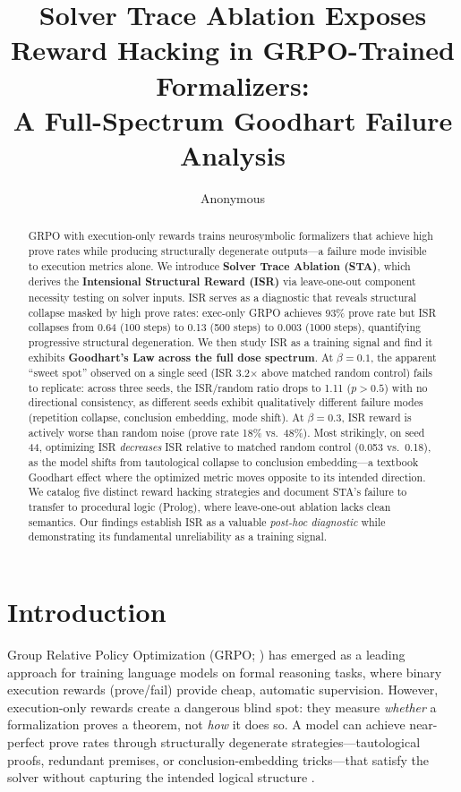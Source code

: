 \documentclass[11pt,a4paper]{article}
\title{Solver Trace Ablation Exposes Reward Hacking in GRPO-Trained Formalizers:\\A Full-Spectrum Goodhart Failure Analysis}
\author{Anonymous}
\date{}
\begin{document}
\maketitle

\begin{abstract}
GRPO with execution-only rewards trains neurosymbolic formalizers that achieve high prove rates while producing structurally degenerate outputs---a failure mode invisible to execution metrics alone.
We introduce \textbf{Solver Trace Ablation (STA)}, which derives the \textbf{Intensional Structural Reward (ISR)} via leave-one-out component necessity testing on solver inputs.
ISR serves as a diagnostic that reveals structural collapse masked by high prove rates: exec-only GRPO achieves 93\% prove rate but ISR collapses from 0.64 (100 steps) to 0.13 (500 steps) to 0.003 (1000 steps), quantifying progressive structural degeneration.
We then study ISR as a training signal and find it exhibits \textbf{Goodhart's Law across the full dose spectrum}.
At $\beta{=}0.1$, the apparent ``sweet spot'' observed on a single seed (ISR 3.2$\times$ above matched random control) fails to replicate: across three seeds, the ISR/random ratio drops to 1.11 ($p > 0.5$) with no directional consistency, as different seeds exhibit qualitatively different failure modes (repetition collapse, conclusion embedding, mode shift).
At $\beta{=}0.3$, ISR reward is actively worse than random noise (prove rate 18\% vs.\ 48\%).
Most strikingly, on seed 44, optimizing ISR \emph{decreases} ISR relative to matched random control (0.053 vs.\ 0.18), as the model shifts from tautological collapse to conclusion embedding---a textbook Goodhart effect where the optimized metric moves opposite to its intended direction.
We catalog five distinct reward hacking strategies and document STA's failure to transfer to procedural logic (Prolog), where leave-one-out ablation lacks clean semantics.
Our findings establish ISR as a valuable \emph{post-hoc diagnostic} while demonstrating its fundamental unreliability as a training signal.
\end{abstract}

\section{Introduction}
\label{sec:intro}

Group Relative Policy Optimization (GRPO; \citealp{shao2024deepseekmath}) has emerged as a leading approach for training language models on formal reasoning tasks, where binary execution rewards (prove/fail) provide cheap, automatic supervision.
However, execution-only rewards create a dangerous blind spot: they measure \emph{whether} a formalization proves a theorem, not \emph{how} it does so.
A model can achieve near-perfect prove rates through structurally degenerate strategies---tautological proofs, redundant premises, or conclusion-embedding tricks---that satisfy the solver without capturing the intended logical structure \cite{skalse2022defining, pan2022effects}.
\end{document}
